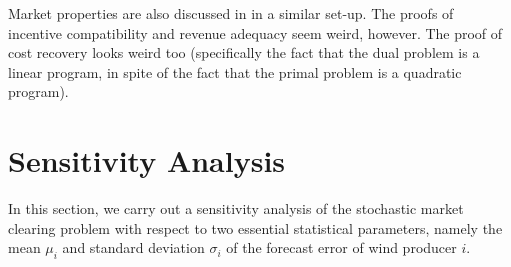 \documentclass{article}
\begin{document}
Market properties are also discussed in \cite{Ratha2019} in a similar set-up. The proofs of incentive compatibility and revenue adequacy seem weird, however. The proof of cost recovery looks weird too (specifically the fact that the dual problem is a linear program, in spite of the fact that the primal problem is a quadratic program). 

\section{Sensitivity Analysis}

In this section, we carry out a sensitivity analysis of the stochastic market clearing problem with respect to two essential statistical parameters, namely the mean $\mu_i$ and standard deviation $\sigma_i$ of the forecast error of wind producer $i$.
\end{document}

